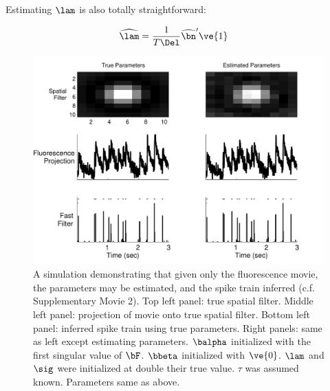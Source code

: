 Estimating $\lam$ is also totally straightforward:

\begin{align} 
\widehat{\lam} &=  \frac{1}{T \Del} \hnm' \ve{1} \label{eq:lam}
\end{align}


\begin{figure}[H]
\centering \includegraphics[width=.9\linewidth]{../figs/spatial_EM}
\caption{A simulation demonstrating that given only the fluorescence movie, the parameters may be estimated, and the spike train inferred (c.f. Supplementary Movie 2). Top left panel: true spatial filter.  Middle left panel: projection of movie onto true spatial filter. Bottom left panel: inferred spike train using true parameters. Right panels: same as left except estimating parameters.  $\balpha$ initialized with the first singular value of $\bF$.  $\bbeta$ initialized with $\ve{0}$.  $\lam$ and $\sig$ were initialized at double their true value.  $\tau$ was assumed known. Parameters same as above.} \label{fig:spatial_EM}
\end{figure}

